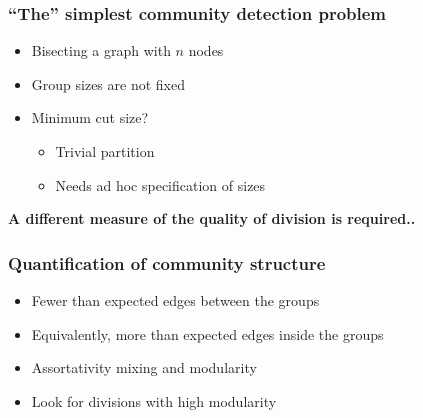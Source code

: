 \documentclass{beamer}
\begin{document}
\begin{frame}
    \frametitle{``The'' simplest community detection problem}
    \centering
    \begin{itemize}
    \setlength\itemsep{1em}
        \item{Bisecting a graph with $n$ nodes}
        \item{Group sizes are not fixed}
        \item{Minimum cut size?

            \begin{itemize}
            \setlength\itemsep{1em}
                \item{Trivial partition}
                \item{Needs ad hoc specification of sizes}
            \end{itemize}



}

    \end{itemize}

    \vspace{2em}
    \pause
    {\bf A different measure of the quality of division is required..}
\end{frame}
\begin{frame}
    \frametitle{Quantification of community structure}
    \centering

    \begin{itemize}
        \setlength\itemsep{1em}
        \item{Fewer than expected edges between the groups}
            \pause
        \item{Equivalently, more than expected edges inside the groups}
            \pause
        \item{Assortativity mixing and modularity}
            \pause
        \item{Look for divisions with high modularity}
    \end{itemize}

\end{frame}
\end{document}
